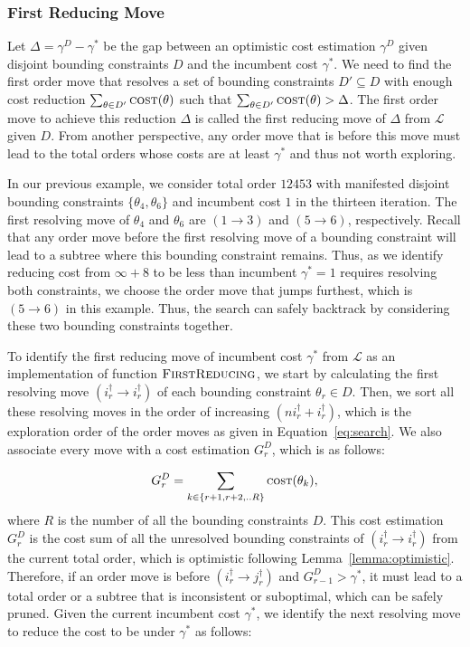 \documentclass[letterpaper]{article} %
\theoremstyle{definition}
\newcommand{\LE}{\mathcal{L}}
\begin{document}
\subsubsection{First Reducing Move}
\label{sec:approach:cdito:resolution}
Let $\Delta = \gamma^D - \gamma^*$ be the gap between an optimistic cost estimation $\gamma^D$ given disjoint bounding constraints $D$ and the incumbent cost $\gamma^*$. We need to find the first order move that resolves a set of bounding constraints $D' \subseteq D$ with enough cost reduction $\sum_{\theta \in D'}  \textsc{cost}(\theta)$ such that $\sum_{\theta \in D'}  \textsc{cost}(\theta) > \Delta$. The first order move to achieve this reduction $\Delta$ is called the first reducing move of $\Delta$ from $\mathcal{L}$ given $D$. From another perspective, any order move that is before this move must lead to the total orders whose costs are at least $\gamma^*$ and thus not worth exploring.

In our previous example, we consider total order $12453$ with manifested disjoint bounding constraints $\{\theta_4, \theta_6\}$ and incumbent cost $1$ in the thirteen iteration. The first resolving move of $\theta_4$ and $\theta_6$ are $(1 \rightarrow 3)$ and $(5 \rightarrow 6)$, respectively. Recall that any order move before the first resolving move of a bounding constraint will lead to a subtree where this bounding constraint remains. Thus, as we identify reducing cost from $\infty + 8$ to be less than incumbent $\gamma^*=1$ requires resolving both constraints, we choose the order move that jumps furthest, which is $(5 \rightarrow 6)$ in this example. Thus, the search can safely backtrack by considering these two bounding constraints together.

To identify the first reducing move of incumbent cost $\gamma^*$ from $\LE$ as an implementation of function $\textsc{FirstReducing}$, we start by calculating the first resolving move $(i^\dagger_r \rightarrow i^\dagger_r)$ of each bounding constraint $\theta_r \in D$. Then, we sort all these resolving moves in the order of increasing $(ni^\dagger_r + i^\dagger_r)$, which is the exploration order of the order moves as given in Equation~\ref{eq:search}. We also associate every move with a cost estimation $G^D_r$, which is as follows:

\begin{equation}\label{eq:cost}\small
    G^D_r  = \sum_{k \in \{r+1,r+2,..R\}} \textsc{cost}(\theta_k),
\end{equation}
where $R$ is the number of all the bounding constraints $D$. This cost estimation $G^D_r$ is the cost sum of all the unresolved bounding constraints of $(i^\dagger_r \rightarrow i^\dagger_r)$ from the current total order, which is optimistic following Lemma~\ref{lemma:optimistic}. Therefore, if an order move is before $(i^\dagger_r \rightarrow j^\dagger_r)$ and $G^D_{r-1} > \gamma^*$, it must lead to a total order or a subtree that is inconsistent or suboptimal, which can be safely pruned. Given the current incumbent cost $\gamma^*$, we identify the next resolving move to reduce the cost to be under $\gamma^*$ as follows:
\end{document}
